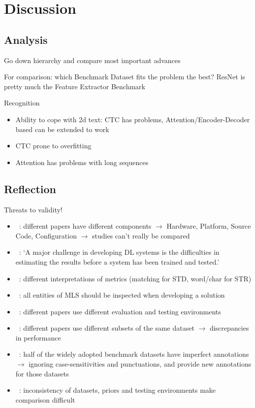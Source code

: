 \chapter{Discussion}\label{ch:discussion}
\section{Analysis}
Go down hierarchy and compare most important advances

For comparison: which Benchmark Dataset fits the problem the best?
ResNet is pretty much the Feature Extractor Benchmark

Recognition
\begin{itemize}
    \item Ability to cope with 2d text:
        CTC has problems,
        Attention/Encoder-Decoder based can be extended to work
    \item CTC prone to overfitting
    \item Attention has problems with long sequences
\end{itemize}


\section{Reflection}
Threats to validity!
\begin{itemize}
    \item~\cite{arpteg_software_2018}: different papers have different components
        $\rightarrow$ Hardware, Platform, Source Code, Configuration
        $\rightarrow$ studies can't really be compared
    \item~\cite{arpteg_software_2018}: `A major challenge in developing DL systems is the
        difficulties in estimating the results before a system has been trained and tested.'
    \item~\cite{long_scene_2021}: different interpretations of metrics (matching for \ac{STD},
        word/char for \ac{STR})
    \item~\cite{siebert_construction_2021,nakamichi_requirements-driven_2020}: all entities of
        \ac{MLS} should be inspected when developing a solution
    \item~\cite{baek_what_2019}: different papers use different evaluation and testing environments
    \item~\cite{baek_what_2019}: different papers use different subsets of the same dataset
        $\rightarrow$ discrepancies in performance
    \item~\cite{long_unrealtext_2020}: half of the widely adopted benchmark datasets have imperfect
        annotations $\rightarrow$ ignoring case-sensitivities and punctuations, and provide new
        annotations for those datasets
    \item~\cite{chen_text_2021}: inconsistency of datasets, priors and testing environments make
        comparison difficult
\end{itemize}

